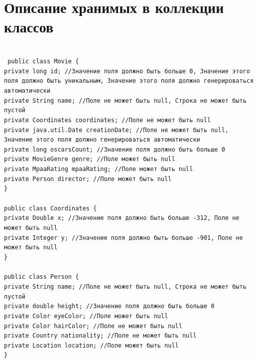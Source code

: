 \newpage


\section{Описание хранимых в коллекции классов}
\\
\texttt{
    \noindent public class Movie \{ \\
    private long id; //Значение поля должно быть больше 0, Значение этого поля должно быть уникальным, Значение этого поля должно генерироваться автоматически\\
    private String name; //Поле не может быть null, Строка не может быть пустой\\
    private Coordinates coordinates; //Поле не может быть null\\
    private java.util.Date creationDate; //Поле не может быть null, Значение этого поля должно генерироваться автоматически\\
    private long oscarsCount; //Значение поля должно быть больше 0\\
    private MovieGenre genre; //Поле может быть null\\
    private MpaaRating mpaaRating; //Поле может быть null\\
    private Person director; //Поле может быть null\\
    \} \\
    \\
    public class Coordinates \{ \\
    private Double x; //Значение поля должно быть больше -312, Поле не может быть null\\
    private Integer y; //Значение поля должно быть больше -901, Поле не может быть null\\
    \} \\
    \\
    public class Person \{ \\
    private String name; //Поле не может быть null, Строка не может быть пустой\\
    private double height; //Значение поля должно быть больше 0\\
    private Color eyeColor; //Поле может быть null\\
    private Color hairColor; //Поле не может быть null\\
    private Country nationality; //Поле не может быть null\\
    private Location location; //Поле может быть null\\
    \} \\
}
